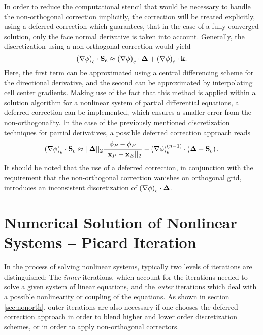 In order to reduce the computational stencil that would be necessary to handle the non-orthogonal correction implicitly, the correction will be treated explicitly, using a deferred correction which guarantees, that in the case of a fully converged solution, only the face normal derivative is taken into account. Generally, the discretization using a non-orthogonal correction would yield 
\begin{displaymath}
  \left( \nabla \phi \right)_e \cdot \mathbf{S}_e \approx \left(\nabla \phi \right)_e \cdot \boldsymbol{\Delta} + \left( \nabla \phi \right)_e \cdot \mathbf{k}.
\end{displaymath}
Here, the first term can be approximated using a central differencing scheme for the directional derivative, and the second can be approximated by interpolating cell center gradients. Making use of the fact that this method is applied within a solution algorithm for a nonlinear system of partial differential equations, a deferred correction can be implemented, which ensures a smaller error from the non-orthogonality. In the case of the previously mentioned discretization techniques for partial derivatives, a possible deferred correction approach reads
\begin{displaymath}
  \left( \nabla \phi \right)_e \cdot \mathbf{S}_e \approx ||\boldsymbol{\Delta}||_2 \frac{\phi_P - \phi_E}{||\mathbf{x}_P - \mathbf{x}_E||_2} - \left(\nabla \phi \right)_e^{(n-1)} \cdot \left(\boldsymbol{\Delta} - \mathbf{S}_e \right).
\end{displaymath}
It should be noted that the use of a deferred correction, in conjunction with the requirement that the non-orthogonal correction vanishes on orthogonal grid, introduces an inconsistent discretization of \( \left(\nabla \phi \right)_e \cdot \boldsymbol{\Delta} \).

\section{Numerical Solution of Nonlinear Systems -- Picard Iteration}
\label{sec:nonlinear}

In the process of solving nonlinear systems, typically two levels of iterations are distinguished: The \emph{inner} iterations, which account for the iterations needed to solve a given system of linear equations, and the \emph{outer} iterations which deal with a possible nonlinearity or coupling of the equations. As shown in section \ref{sec:nonorth}, outer iterations are also necessary if one chooses the deferred correction approach in order to blend higher and lower order discretization schemes, or in order to apply non-orthogonal correctors.

